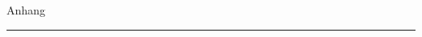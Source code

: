 \cleardoublepage
\thispagestyle{empty}

\vspace*{4.0cm}
\begin{flushright}
	\thesispartlabelfont Anhang
	{\color{ctcolorpartline}%
				\hspace*{-200pt}\rule[45pt]{600pt}{2pt}}
\end{flushright}

\setcounter{chapter}{0}
\renewcommand\thechapter{\Alph{chapter}}

